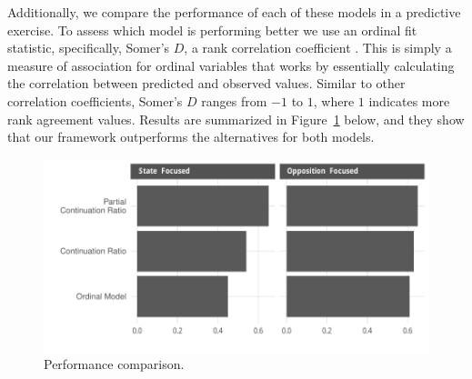 Additionally, we compare the performance of each of these models in a predictive exercise. To assess which model is performing better we use an ordinal fit statistic, specifically, Somer's $D$, a rank correlation coefficient \citep{Somers1962}. This is simply a measure of association for ordinal variables that works by essentially calculating the correlation between predicted and observed values. Similar to other correlation coefficients, Somer's $D$ ranges from $-1$ to $1$, where $1$ indicates more rank agreement values. Results are summarized in Figure~\ref{fig:somersD} below, and they show that our framework outperforms the alternatives for both models.

\begin{figure}
    \centering
    \includegraphics[width=1\textwidth]{somerViz.pdf}
    \caption{Performance comparison.}
    \label{fig:somersD}
\end{figure}




